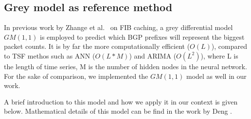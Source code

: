\subsection{Grey model as reference method}
In previous work by Zhange et al.\ \cite{Zhang2012} on FIB caching, a grey differential model $GM(1,1)$ \cite{Julong1989} is employed to  predict which BGP prefixes will represent the  biggest packet counts. 
It is by far the more computationally efficient ($O(L)$), compared to \ac{TSF} methos such as \ac{ANN} ($O(L*M)$) and \ac{ARIMA} ($O(L^2)$), where L is the length of time series, M is the number of hidden nodes in the neural network.
For the sake of comparison, we implemented the $GM(1,1)$ model as well in our work. 

A brief introduction to this model and how we apply it in our context is given below. Mathematical details of this model can be find in the work by Deng \cite{Julong1989}.

